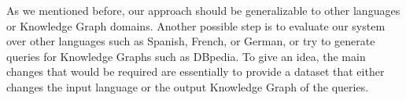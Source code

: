 As we mentioned before, our approach should be generalizable to other languages or Knowledge Graph 
domains. Another possible step is to evaluate our system over other languages such as Spanish, 
French, or German, or try to generate \SPARQL{} queries for Knowledge Graphs such as DBpedia. To give 
an idea, the main changes that would be required are essentially to provide a dataset that either 
changes the input language or the output Knowledge Graph of the \SPARQL{} queries. 
